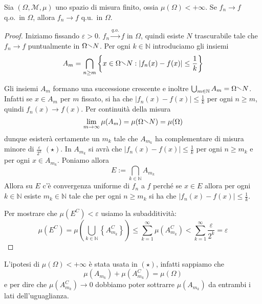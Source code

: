 \begin{theorem}\label{thm:severini-egorov}
    Sia \({(\Omega, \mathcal{M}, \mu)}\) uno spazio di misura finito, ossia
    \(\mu{(\Omega)} < +\infty\). Se \(f_{n} \to f\) q.o.~in \(\Omega\), allora
    \(f_{n} \to f\) q.u.~in \(\Omega\).
\end{theorem}
\begin{proof}
    Iniziamo fissando \(\varepsilon>0\).
    \(f_{n} \overset{q.o.}{\to } f\) in \(\Omega\), quindi esiste \(N\)
    trascurabile tale che \(f_{n} \to f\) puntualmente in \(\Omega \sminus N\).
    Per ogni \(k \in \mathbb{N}\) introduciamo gli insiemi \[A_{m} = \bigcap_{n
    \ge m} \left\{x \in \Omega \sminus N : \left| f_{n}{(x)} - f{(x)} \right| \le
\frac{1}{k}\right\} \]

    Gli insiemi \(A_{m}\) formano una successione crescente e inoltre 
    \(
        \bigcup_{m \in \mathbb{N}} A_{m} = \Omega \sminus N
    \).
    Infatti se \(x \in A_{m}\) per \(m\) fissato, si ha che
    \(|f_{n}{(x)} - f{(x)}| \le \frac{1}{k}\) per ogni \(n\ge m\), quindi
    \(f_{n}{(x)} \to f{(x)}\). Per continuità della misura 
    \[
        \lim_{m \to \infty} \mu{(A_{m})} = \mu{(\Omega \sminus N)} = \mu{(\Omega)}
    \]
    dunque esisterà certamente un \(m_k\) tale che \(A_{m_k}\) ha complementare
    di misura minore di \(\frac{\varepsilon}{2^{k}}\) \((\star)\). In \(A_{m_k}\) si avrà
    che \(|f_{n}{(x)} - f{(x)}| \le \frac{1}{k}\) per ogni \(n \ge m_k\) e per
    ogni \(x \in A_{m_k} \). Poniamo allora
    \[
        E := \bigcap_{k \in \mathbb{N}} A_{m_k}
    \]
    Allora su \(E\) c'è convergenza uniforme di \(f_{n}\) a \(f\) perché
    se \(x \in E\) allora per ogni \(k \in \mathbb{N}\) esiste \(m_k \in
    \mathbb{N}\) tale che per ogni \(n \ge m_k\) si ha che \(|f_{n}{(x)} -
    f{(x)}| \le \frac{1}{k}\). 

    Per mostrare che \(\mu {\left( E^{C} \right)} < \varepsilon\) usiamo la subadditività:
    \[
        \mu{\left( E^{C} \right)} = \mu {\left( \bigcup_{k \in \mathbb{N}}
    \left\{ A_{m_k}^C \right\} \right)} \le \sum_{k=1}^{\infty} \mu{(A_{m_k}^{C})} <
    \sum_{k=1}^{\infty} \frac{\varepsilon}{2^{k}} = \varepsilon 
    \]
\end{proof}
\begin{note}
    L'ipotesi di \(\mu{(\Omega)} < +\infty\) è stata usata in \((\star)\),
    infatti sappiamo che
    \[
        \mu{\left( A_{m_k}  \right)} +\mu{\left( A_{m_k} ^{C} \right)} = \mu{(\Omega)}
    \]
    e per dire che \(\mu{\left( A_{m_k} ^{C} \right)} \to 0\) dobbiamo poter
    sottrarre \(\mu{\left( A_{m_k}  \right)} \) da entrambi i lati
    dell'uguaglianza.
\end{note}

